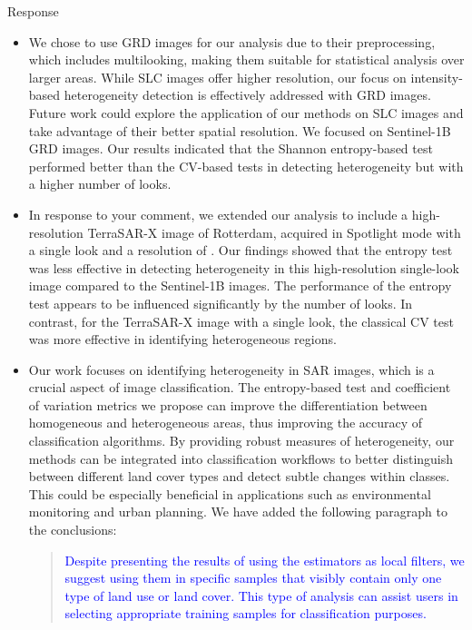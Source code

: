 \documentclass[11pt]{report}
\begin{document}
\begin{responsebox}{Response}
\begin{itemize}
 \item We chose to use GRD images for our analysis due to their preprocessing, which includes multilooking, making them suitable for statistical analysis over larger areas. While SLC images offer higher resolution, our focus on intensity-based heterogeneity detection is effectively addressed with GRD images. 
Future work could explore the application of our methods on SLC images and take advantage of their better spatial resolution.
We focused on Sentinel-1B GRD images. Our results indicated that the Shannon entropy-based test performed better than the CV-based tests in detecting heterogeneity but with a higher number of looks.

\item In response to your comment, we extended our analysis to include a high-resolution TerraSAR-X image of Rotterdam, acquired in Spotlight mode with a single look and a resolution of .
Our findings showed that the entropy test was less effective in detecting heterogeneity in this high-resolution single-look image compared to the Sentinel-1B images. 
The performance of the entropy test appears to be influenced significantly by the number of looks.
In contrast, for the TerraSAR-X image with a single look, the classical CV test was more effective in identifying heterogeneous regions.

\item Our work focuses on identifying heterogeneity in SAR images, which is a crucial aspect of image classification. 
The entropy-based test and coefficient of variation metrics we propose can improve the differentiation between homogeneous and heterogeneous areas, thus improving the accuracy of classification algorithms. 
By providing robust measures of heterogeneity, our methods can be integrated into classification workflows to better distinguish between different land cover types and detect subtle changes within classes. This could be especially beneficial in applications such as environmental monitoring and urban planning.
We have added the following paragraph to the conclusions:
\begin{quote}
	\textcolor{blue}{Despite presenting the results of using the estimators as local filters, we suggest using them in specific samples that visibly contain only one type of land use or land cover. 
		This type of analysis can assist users in selecting appropriate training samples for classification purposes.}
\end{quote}
\end{itemize}




\end{responsebox}
\end{document}
